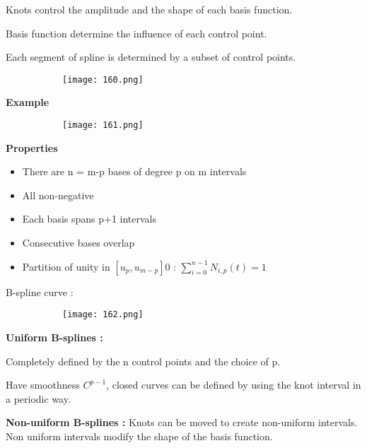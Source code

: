 \documentclass{article}
\begin{document}
Knots control the amplitude and the shape of each basis function.

Basis function determine the influence of each control point.

Each segment of spline is determined by a subset of control points.

    \begin{figure}[ht!]
  \centering
  \begin{subfigure}[b]{0.8\linewidth}
    \texttt{[image: 160.png]}
  \end{subfigure}
\end{figure}

\textbf{Example}

    \begin{figure}[ht!]
  \centering
  \begin{subfigure}[b]{0.8\linewidth}
    \texttt{[image: 161.png]}
  \end{subfigure}
\end{figure}

\textbf{Properties}

\begin{itemize}
    \item There are n = m-p bases of degree p on m intervals
    \item All non-negative
    \item Each basis spans p+1 intervals
    \item Consecutive bases overlap
    \item Partition of unity in $[u_p,u_{m-p}]0$ : $\sum_{i=0}^{n-1} N_{i,p} (t) = 1$
\end{itemize}

B-spline curve :

    \begin{figure}[ht!]
  \centering
  \begin{subfigure}[b]{0.8\linewidth}
    \texttt{[image: 162.png]}
  \end{subfigure}
\end{figure}

\textbf{Uniform B-splines :}

Completely defined by the n control points and the choice of p.

Have smoothness $C^{p-1}$, closed curves can be defined by using the knot interval in a periodic way.

\textbf{Non-uniform B-splines :} Knots can be moved to create non-uniform intervals. Non uniform intervals modify the shape of the basis function.
\end{document}
